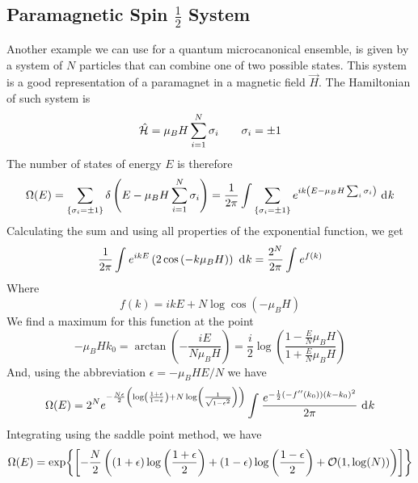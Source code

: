\documentclass[../qm.tex]{subfiles}
\begin{document}
		\subsection{Paramagnetic Spin $\frac{1}{2}$ System}
		Another example we can use for a quantum microcanonical ensemble, is given by a system of $N$ particles that can combine one of two possible states. This system is a good representation of a paramagnet in a magnetic field $\vec{H}$. The Hamiltonian of such system is
		\begin{equation}
			\hat{\mathcal{H}}=\mu_BH\sum_{i=1}^N\sigma_i\qquad\sigma_i=\pm1
			\label{eq:paramagnethamiltonian}
		\end{equation}
		The number of states of energy $E$ is therefore
		\begin{equation}
			\Omega(E)=\sum_{\{\sigma_i=\pm1\}}\delta\left( E-\mu_BH\sum_{i=1}^N\sigma_i \right)=\frac{1}{2\pi}\int\sum_{\{\sigma_i=\pm1\}}e^{ik\left( E-\mu_BH\sum_{i}\sigma_i \right)}\ \mathrm{d}^{}k
			\label{eq:deltatransformparamagnet}
		\end{equation}
		Calculating the sum and using all properties of the exponential function, we get
		\begin{equation}
			\frac{1}{2\pi}\int_{}^{}e^{ikE}\left( 2\cos\left( -k\mu_BH \right) \right)\ \mathrm{d}^{}k=\frac{2^N}{2\pi}\int_{}^{}e^{f(k)}
			\label{eq:saddlepointutilization}
		\end{equation}
		Where
		\begin{equation*}
			f(k)=ikE+N\log\cos(-\mu_BH)
		\end{equation*}
		We find a maximum for this function at the point
		\begin{equation}
			-\mu_BHk_0=\arctan\left( -\frac{iE}{N\mu_BH} \right)=\frac{i}{2}\log\left( \frac{1-\frac{E}{N}\mu_BH}{1+\frac{E}{N}\mu_BH} \right)
			\label{eq:maximumsaddlepointparamagnet}
		\end{equation}
		And, using the abbreviation $\epsilon=-\mu_BHE/N$ we have
		\begin{equation}
		\Omega(E)=2^Ne^{-\frac{N\epsilon}{2}\left(\log\left( \frac{1+\epsilon}{1-\epsilon} \right)+N\log\left( \frac{1}{\sqrt{1-\epsilon^2}} \right) \right)}\int_{}^{}\frac{e^{-\frac{1}{2}(-f''(k_0))(k-k_0)^2}}{2\pi}\ \mathrm{d}^{}k
			\label{eq:OmegaEapproximation}
		\end{equation}
		Integrating using the saddle point method, we have
		\begin{equation}
		\Omega(E)=\exp{\left[-\frac{N}{2}\left( (1+\epsilon)\log\left( \frac{1+\epsilon}{2}\right)+(1-\epsilon)\log\left( \frac{1-\epsilon}{2} \right)+\order{1,\log(N)} \right)\right]}
			\label{eq:OmegaEparamagnet}
		\end{equation}
\end{document}
